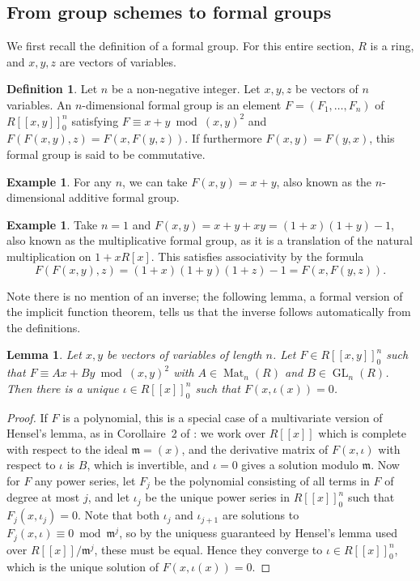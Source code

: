 \documentclass[12pt]{article}
\newcommand{\m}{\mathfrak{m}}
\DeclareMathOperator{\GL}{GL}
\DeclareMathOperator{\Mat}{Mat}
\theoremstyle{plain}
\newtheorem{lem}[thm]{Lemma} %
\theoremstyle{definition}
\newtheorem{defn}[thm]{Definition} %
\newtheorem{exmp}[thm]{Example} %
\theoremstyle{remark}
\begin{document}
\subsection{From group schemes to formal groups}
We first recall the definition of a formal group. For this entire section, $R$ is a ring, and $x,y,z$ are vectors of variables.
\begin{defn}
\label{defn:formalgroup}
Let $n$ be a non-negative integer. Let $x,y,z$ be vectors of $n$ variables. An $n$-dimensional formal group is an element $F = (F_1,\dots,F_n)$ of $R[[x,y]]_0^n$ satisfying $F \equiv x + y \bmod (x,y)^2$ and $F(F(x,y),z) = F(x,F(y,z))$. If furthermore $F(x,y) = F(y,x)$, this formal group is said to be commutative.
\end{defn}
\begin{exmp}
\label{exmp:ganformalgroup}
For any $n$, we can take $F(x,y) = x+ y$, also known as the $n$-dimensional additive formal group.
\end{exmp}
\begin{exmp}
\label{exmp:gmformalgroup}
Take $n=1$ and $F(x,y) = x + y + xy = (1+x)(1+y)-1$, also known as the multiplicative formal group, as it is a translation of the natural multiplication on $1 + xR[x]$. This satisfies associativity by the formula \[F(F(x,y),z) = (1+x)(1+y)(1+z)-1 = F(x,F(y,z)).\]
\end{exmp}
Note there is no mention of an inverse; the following lemma, a formal version of the implicit function theorem, tells us that the inverse follows automatically from the definitions.
\begin{lem}
\label{lem:implicitfunction}
Let $x,y$ be vectors of variables of length $n$. Let $F \in R[[x,y]]_0^n$ such that $F \equiv Ax + By \bmod (x,y)^2$ with $A \in \Mat_n(R)$ and $B \in \GL_n(R)$. Then there is a unique $\iota \in R[[x]]_0^n$ such that $F(x,\iota(x)) = 0$. 
\end{lem}
\begin{proof}
If $F$ is a polynomial, this is a special case of a multivariate version of Hensel's lemma, as in Corollaire~2 of \cite[III,4.5]{BourbakiCA}: we work over $R[[x]]$ which is complete with respect to the ideal $\m = (x)$, and the derivative matrix of $F(x,\iota)$ with respect to $\iota$ is $B$, which is invertible, and $\iota = 0$ gives a solution modulo $\m$. Now for $F$ any power series, let $F_j$ be the polynomial consisting of all terms in $F$ of degree at most $j$, and let $\iota_j$ be the unique power series in $R[[x]]_0^n$ such that $F_j(x,\iota_j) = 0$. Note that both $\iota_j$ and $\iota_{j+1}$ are solutions to $F_j(x,\iota) \equiv 0 \bmod \m^j$, so by the uniquess guaranteed by Hensel's lemma used over $R[[x]]/\m^j$, these must be equal. Hence they converge to $\iota \in R[[x]]_0^n$, which is the unique solution of $F(x,\iota(x)) = 0$.
\end{proof}
\end{document}
